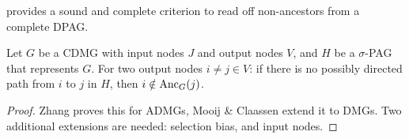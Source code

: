\cite[p. 137]{Zhang2006} provides a sound and complete criterion to read off non-ancestors from a complete DPAG. 
\begin{Prp}
Let $G$ be a CDMG with input nodes $J$ and output nodes $V$, and $H$ be a $\sigma$-PAG that represents $G$.
For two output nodes $i \ne j \in V$:
if there is no possibly directed path from $i$ to $j$ in $H$, then $i \notin \mathrm{Anc}_G(j)$.
\end{Prp}
\begin{proof}
  Zhang proves this for ADMGs, Mooij \& Claassen extend it to DMGs.
  Two additional extensions are needed: selection bias, and input nodes.
\end{proof}
